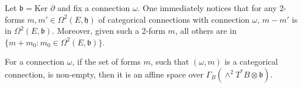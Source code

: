 Let  $\mathfrak{b}=\text{Ker }\partial$ and fix a connection $\omega$. One immediately notices that for any 2-forms $m, m'\in \Omega^2(E,\mathfrak{h})$ of categorical connections with connection $\omega$, $m-m'$ is in $\Omega^2(E,\mathfrak{b})$. Moreover, given such a 2-form $m$, all others are in $\{m+m_0: m_0\in \Omega^2(E,\mathfrak{b})\}$.
\begin{corollary}
For a connection $\omega$, if the set of forms $m$, such that $(\omega,m)$ is a categorical connection, is non-empty, then it is an affine space over $\Gamma_B(\wedge^2T^*B\otimes \mathfrak{b})$.
\end{corollary}


